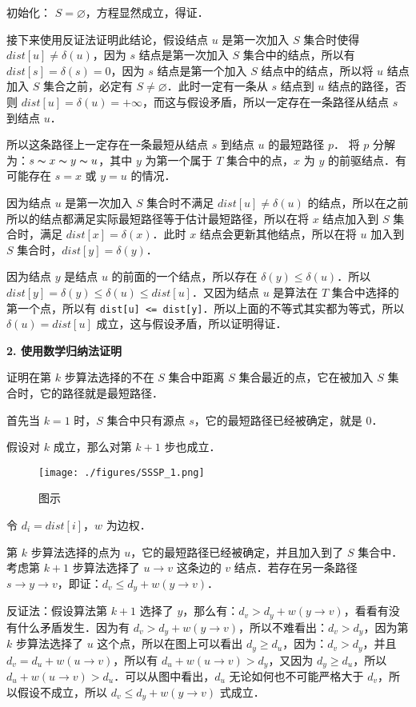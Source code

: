 初始化： $S = \varnothing$，方程显然成立，得证．

接下来使用反证法证明此结论，假设结点 $u$ 是第一次加入 $S$ 集合时使得 $dist[u] \neq \delta(u)$，因为 $s$ 结点是第一次加入 $S$ 集合中的结点，所以有 $dist[s] = \delta(s) = 0$，因为 $s$ 结点是第一个加入 $S$ 结点中的结点，所以将 $u$ 结点加入 $S$ 集合之前，必定有 $S \neq \varnothing$．此时一定有一条从 $s$ 结点到 $u$ 结点的路径，否则 $dist[u] = \delta(u) = +\infty$，而这与假设矛盾，所以一定存在一条路径从结点 $s$ 到结点 $u$．

所以这条路径上一定存在一条最短从结点 $s$ 到结点 $u$ 的最短路径 $p$．
将 $p$ 分解为：$s \thicksim x \thicksim y \thicksim u$，其中 $y$ 为第一个属于 $T$ 集合中的点，$x$ 为 $y$ 的前驱结点．有可能存在 $s = x$ 或 $y = u$ 的情况．

因为结点 $u$ 是第一次加入 $S$ 集合时不满足 $dist[u] \neq \delta(u)$ 的结点，所以在之前所以的结点都满足实际最短路径等于估计最短路径，所以在将 $x$ 结点加入到 $S$ 集合时，满足 $dist[x] = \delta(x)$．此时 $x$ 结点会更新其他结点，所以在将 $u$ 加入到 $S$ 集合时，$dist[y] = \delta(y)$．

因为结点 $y$ 是结点 $u$ 的前面的一个结点，所以存在 $\delta(y) \leq \delta(u)$．所以 $dist[y] = \delta(y) \leq \delta(u) \leq dist[u]$．又因为结点 $u$ 是算法在 $T$ 集合中选择的第一个点，所以有 \verb|dist[u] <= dist[y]|．所以上面的不等式其实都为等式，所以 $\delta(u) = dist[u]$ 成立，这与假设矛盾，所以证明得证．

\textbf{2. 使用数学归纳法证明}

证明在第 $k$ 步算法选择的不在 $S$ 集合中距离 $S$ 集合最近的点，它在被加入 $S$ 集合时，它的路径就是最短路径．

首先当 $k = 1$ 时，$S$ 集合中只有源点 $s$，它的最短路径已经被确定，就是 $0$．

假设对 $k$ 成立，那么对第 $k + 1$ 步也成立．

\begin{figure}[ht]
\centering
\texttt{[image: ./figures/SSSP\_1.png]}
\caption{图示} \label{SSSP_fig1}
\end{figure}

令 $d_i = dist[i]$，$w$ 为边权．

第 $k$ 步算法选择的点为 $u$，它的最短路径已经被确定，并且加入到了 $S$ 集合中．考虑第 $k + 1$ 步算法选择了 $u \to v$ 这条边的 $v$ 结点．若存在另一条路径 $s \to y \to v$，即证：$d_v \leq d_y + w(y \to v)$．

反证法：假设算法第 $k + 1$ 选择了 $y$，那么有：$d_v > d_y + w(y \to v)$，看看有没有什么矛盾发生．因为有 $d_v > d_y + w(y \to v)$，所以不难看出：$d_v > d_y$，因为第 $k$ 步算法选择了 $u$ 这个点，所以在图上可以看出 $d_y \geq d_u$，因为：$d_v > d_y$，并且 $d_v = d_u + w(u \to v)$，所以有 $d_u + w(u \to v) > d_y$，又因为 $d_y \geq d_u$，所以 $d_u + w(u \to v) > d_u$．可以从图中看出，$d_u$ 无论如何也不可能严格大于 $d_v$，所以假设不成立，所以 $d_v \leq d_y + w(y \to v)$ 式成立． 

